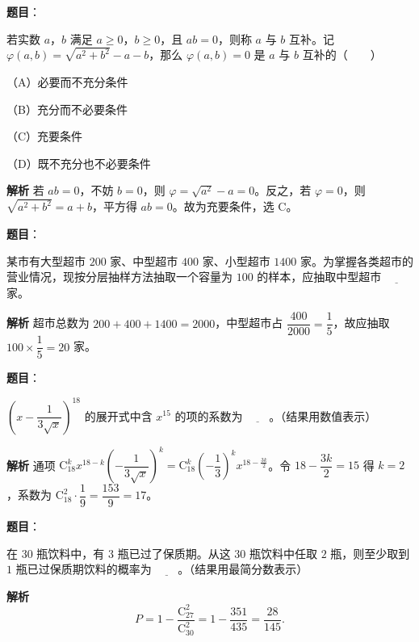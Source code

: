 \begin{answer}

\textbf{题目}：

若实数 $a$，$b$ 满足 $a\geqslant0$，$b\geqslant0$，且 $ab=0$，则称 $a$ 与 $b$ 互补。记 $\varphi(a,b)=\sqrt{a^2+b^2}-a-b$，那么 $\varphi(a,b)=0$ 是 $a$ 与 $b$ 互补的\mbox{（　　）}

（A）必要而不充分条件

（B）充分而不必要条件

（C）充要条件

（D）既不充分也不必要条件

\textbf{解析}
若 $ab=0$，不妨 $b=0$，则 $\varphi=\sqrt{a^2}-a=0$。反之，若 $\varphi=0$，则 $\sqrt{a^2+b^2}=a+b$，平方得 $ab=0$。故为充要条件，选 C。


\end{answer}
\begin{answer}

\textbf{题目}：

某市有大型超市 $200$ 家、中型超市 $400$ 家、小型超市 $1400$ 家。为掌握各类超市的营业情况，现按分层抽样方法抽取一个容量为 $100$ 的样本，应抽取中型超市 $\underline{\qquad}$ 家。

\textbf{解析}
超市总数为 $200+400+1400=2000$，中型超市占 $\dfrac{400}{2000}=\dfrac15$，故应抽取 $100\times\dfrac15=20$ 家。


\end{answer}
\begin{answer}

\textbf{题目}：

$\left(x-\dfrac1{3\sqrt x}\right)^{18}$ 的展开式中含 $x^{15}$ 的项的系数为 $\underline{\qquad}$。（结果用数值表示）

\textbf{解析}
通项 $\mathrm C_{18}^k x^{18-k}\left(-\dfrac1{3\sqrt x}\right)^k=\mathrm C_{18}^k\left(-\dfrac13\right)^k x^{18-\frac{3k}2}$。令 $18-\dfrac{3k}2=15$ 得 $k=2$，系数为 $\mathrm C_{18}^2\cdot\dfrac19=\dfrac{153}9=17$。


\end{answer}
\begin{answer}

\textbf{题目}：

在 $30$ 瓶饮料中，有 $3$ 瓶已过了保质期。从这 $30$ 瓶饮料中任取 $2$ 瓶，则至少取到 $1$ 瓶已过保质期饮料的概率为 $\underline{\qquad}$。（结果用最简分数表示）

\textbf{解析}
\nopagebreak[4]
\[P=1-\frac{\mathrm C_{27}^2}{\mathrm C_{30}^2}=1-\frac{351}{435}=\frac{28}{145}.\]


\end{answer}

